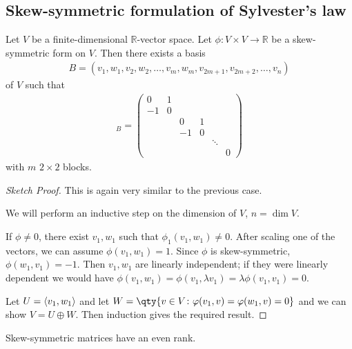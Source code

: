 \subsection{Skew-symmetric formulation of Sylvester's law}
\begin{theorem}
	Let $V$ be a finite-dimensional $\mathbb R$-vector space.
	Let $\phi \colon V \times V \to \mathbb R$ be a skew-symmetric form on $V$.
	Then there exists a basis
	\begin{align*}
		B = (v_1, w_1, v_2, w_2, \dots, v_m, w_m, v_{2m+1}, v_{2m+2}, \dots, v_n)
	\end{align*}
	of $V$ such that
	\begin{align*}
		[\phi]_B = \begin{pmatrix}
			0  & 1                       \\
			-1 & 0                       \\
			   &   & 0  & 1              \\
			   &   & -1 & 0              \\
			   &   &    &   & \ddots     \\
			   &   &    &   &        & 0
		\end{pmatrix}
	\end{align*}
	with $m$ $2 \times 2$ blocks.
\end{theorem}

\begin{proof}[Sketch Proof]
	This is again very similar to the previous case.

	We will perform an inductive step on the dimension of $V$, $n = \dim V$.

	If $\phi \neq 0$, there exist $v_1, w_1$ such that $\phi_1(v_1, w_1) \neq 0$.
	After scaling one of the vectors, we can assume $\phi(v_1, w_1) = 1$.
	Since $\phi$ is skew-symmetric, $\phi(w_1, v_1) = -1$.
	Then $v_1, w_1$ are linearly independent; if they were linearly dependent we would have $\phi(v_1, w_1) = \phi(v_1, \lambda v_1) = \lambda \phi(v_1, v_1) = 0$.
	
	Let $U = \langle{} v_1, w_1 \rangle$ and let $W = \qty{v \in V \colon \phi(v_1, v) = \phi(w_1, v) = 0}$ and we can show $V = U \oplus W$.
	Then induction gives the required result.
\end{proof}

\begin{corollary}
	Skew-symmetric matrices have an even rank.
\end{corollary}